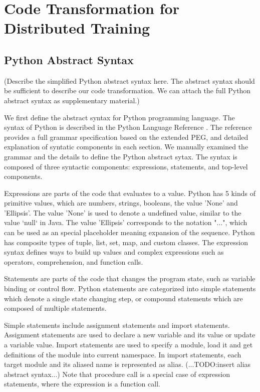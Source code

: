 \section{Code Transformation for Distributed Training}\label{sec:trans}
\subsection{Python Abstract Syntax}\label{sec:pysyn}

(Describe the simplified Python abstract syntax here. 
The abstract syntax should be sufficient to describe our code transformation. 
We can attach the full Python abstract syntax as supplementary material.)

We first define the abstract syntax for Python programming language.
The syntax of Python is described in the Python Language Reference \cite{pythonref}.
The reference provides a full grammar specification based on the extended PEG,
and detailed explanation of syntatic components in each section.
We manually examined the grammar and the details
to define the Python abstract sytax.
The syntax is composed of three syntactic components: expressions, statements,
and top-level components.

Expressions are parts of the code that evaluates to a value.
Python has 5 kinds of primitive values, 
which are numbers, strings, booleans, the value 'None' and 'Ellipsis'.
The value 'None' is used to denote a undefined value,
similar to the value `null` in Java.
The value 'Ellipsis' corresponds to the notation "...",
which can be used as an special placeholder meaning expansion of the sequence. 
Python has composite types of tuple, list, set, map, and custom classes.
The expression syntax defines ways to build up values
and complex expressions such as operators, comprehension, and function calls. 

Statements are parts of the code that changes the program state,
such as variable binding or control flow. 
Python statements are categorized into 
simple statements which denote a single state changing step, 
or compound statements which are composed of multiple statements.

Simple statements include assignment statements and import statements.
Assignment statements are used to declare a new variable and its value
or update a variable value.
Import statements are used to specify a module, load it
and get definitions of the module into current namespace.
In import statements, each target module and its aliased name is represented
as alias. (...TODO:insert alias abstract syntax...)  
Note that procedure call is a special case of expression statements,
where the expression is a function call.

